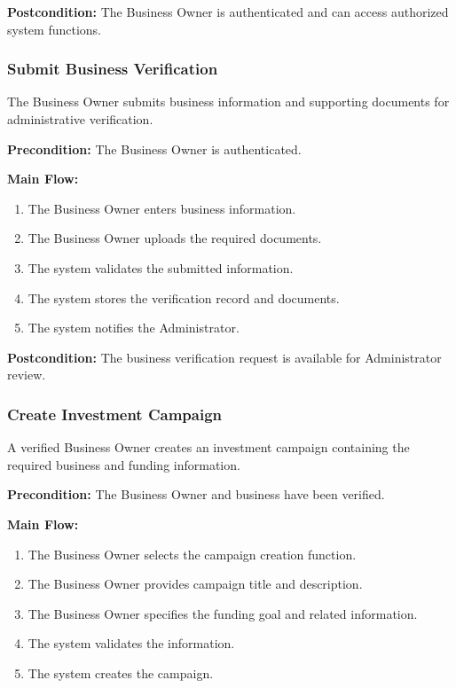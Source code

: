 \textbf{Postcondition:}
The Business Owner is authenticated and can access authorized system
functions.


\subsubsection{Submit Business Verification}

The Business Owner submits business information and supporting documents for
administrative verification.

\textbf{Precondition:}
The Business Owner is authenticated.

\textbf{Main Flow:}
\begin{enumerate}
    \item The Business Owner enters business information.
    \item The Business Owner uploads the required documents.
    \item The system validates the submitted information.
    \item The system stores the verification record and documents.
    \item The system notifies the Administrator.
\end{enumerate}

\textbf{Postcondition:}
The business verification request is available for Administrator review.


\subsubsection{Create Investment Campaign}

A verified Business Owner creates an investment campaign containing the
required business and funding information.

\textbf{Precondition:}
The Business Owner and business have been verified.

\textbf{Main Flow:}
\begin{enumerate}
    \item The Business Owner selects the campaign creation function.
    \item The Business Owner provides campaign title and description.
    \item The Business Owner specifies the funding goal and related
    information.
    \item The system validates the information.
    \item The system creates the campaign.
\end{enumerate}

